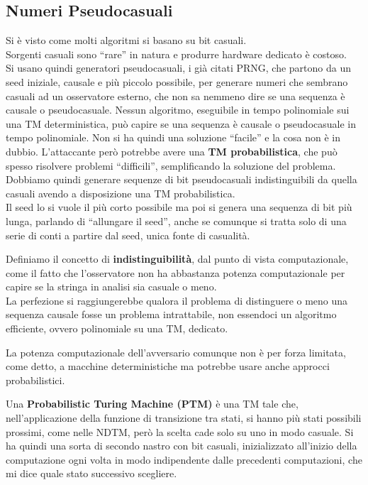 \documentclass[a4paper,12pt, oneside]{book}
\begin{document}
\subsection{Numeri Pseudocasuali}
Si è visto come molti algoritmi si basano su bit casuali. \\
Sorgenti casuali sono ``rare'' in natura e produrre hardware dedicato è
costoso.\\
Si usano quindi generatori pseudocasuali, i già citati PRNG, che partono da un
seed iniziale, causale e più piccolo possibile, per generare numeri che sembrano
casuali ad un osservatore esterno, che non sa nemmeno dire se una sequenza è
causale o pseudocasuale. Nessun algoritmo, eseguibile in tempo polinomiale sui
una TM deterministica, può capire se una sequenza è causale o pseudocasuale in
tempo polinomiale. Non si ha quindi una soluzione ``facile'' e la cosa non è in
dubbio. L'attaccante però potrebbe avere una \textbf{TM probabilistica}, che può
spesso risolvere problemi ``difficili'', semplificando la soluzione del
problema. \\
Dobbiamo quindi generare sequenze di bit pseudocasuali indistinguibili da quella
casuali avendo a disposizione una TM probabilistica.\\
Il seed lo si vuole il più corto possibile ma poi si genera una sequenza di bit
più lunga, parlando di ``allungare il seed'', anche se comunque si tratta solo
di una serie di conti a partire dal seed, unica fonte di casualità.
\begin{definizione}
  Definiamo il concetto di \textbf{indistinguibilità}, dal punto di vista
  computazionale, come il fatto che l'osservatore non ha abbastanza potenza
  computazionale per capire se la stringa in analisi sia casuale o meno. \\
  La perfezione si raggiungerebbe qualora il problema di distinguere o meno una
  sequenza causale fosse un problema intrattabile, non essendoci un algoritmo
  efficiente, ovvero polinomiale su una TM, dedicato.
\end{definizione}
La potenza computazionale dell'avversario comunque non è per forza limitata,
come detto, a macchine deterministiche ma potrebbe usare anche approcci
probabilistici.
\begin{definizione}
  Una \textbf{Probabilistic Turing Machine (PTM)} è una TM tale che,
  nell'applicazione della funzione di transizione tra stati, si hanno più stati
  possibili prossimi, come nelle NDTM, però la scelta cade solo su uno in modo
  casuale. Si ha quindi una sorta di secondo nastro con bit casuali,
  inizializzato all'inizio della computazione ogni volta in modo indipendente
  dalle precedenti computazioni, che mi dice quale stato successivo scegliere.
\end{definizione}
\end{document}
